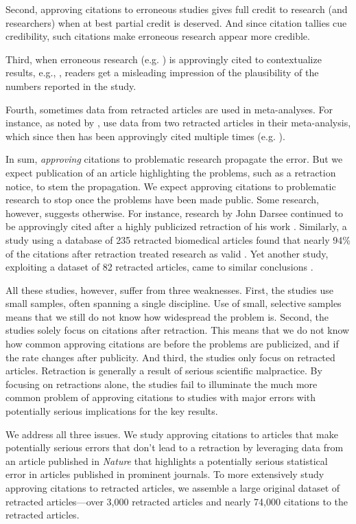 \documentclass[12pt]{article}
\begin{document}
Second, approving citations to erroneous studies gives full credit to research (and researchers) when at best partial credit is deserved. And since citation tallies cue credibility, such citations make erroneous research appear more credible.

Third, when erroneous research (e.g. \cite{rubio2005spontaneous}) is approvingly cited to contextualize results, e.g., \cite{kosaka2012therapeutic}, readers get a misleading impression of the plausibility of the numbers reported in the study.

Fourth, sometimes data from retracted articles are used in meta-analyses. For instance, as noted by \cite{paul2015comment}, \cite{lin2013perioperative} use data from two retracted articles in their meta-analysis, which since then has been approvingly cited multiple times (e.g. \cite{russo2017perioperative}). 

In sum, \textit{approving} citations to problematic research propagate the error. But we expect publication of an article highlighting the problems, such as a retraction notice, to stem the propagation. We expect approving citations to problematic research to stop once the problems have been made public. Some research, however, suggests otherwise. For instance, research by John Darsee continued to be approvingly cited after a highly publicized retraction of his work \cite{kochan1992persistence}. Similarly, a study using a database of 235 retracted biomedical articles found that nearly 94\% of the citations after retraction treated research as valid \cite{budd1998phenomena}. Yet another study, exploiting a dataset of 82 retracted articles, came to similar conclusions \cite{pfeifer1990continued}.

All these studies, however, suffer from three weaknesses. First, the studies use small samples, often spanning a single discipline. Use of small, selective samples means that we still do not know how widespread the problem is. Second, the studies solely focus on citations after retraction. This means that we do not know how common approving citations are before the problems are publicized, and if the rate changes after publicity. And third, the studies only focus on retracted articles. Retraction is generally a result of serious scientific malpractice. By focusing on retractions alone, the studies fail to illuminate the much more common problem of approving citations to studies with major errors with potentially serious implications for the key results.  

We address all three issues.  We study approving citations to articles that make potentially serious errors that don't lead to a retraction by leveraging data from an article published in \textit{Nature} that highlights a potentially serious statistical error in articles published in prominent journals. To more extensively study approving citations to retracted articles, we assemble a large original dataset of retracted articles---over 3,000 retracted articles and nearly 74,000 citations to the retracted articles.
\end{document}
